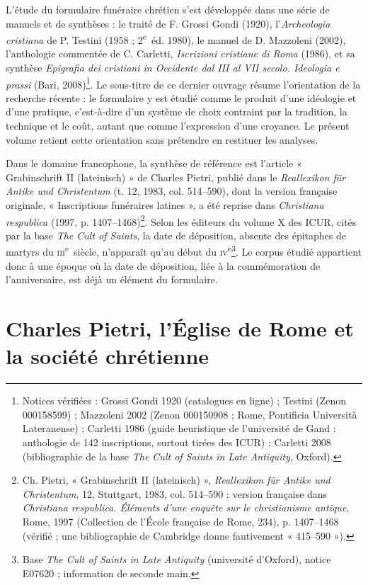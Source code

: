 L’étude du formulaire funéraire chrétien s’est développée dans une série de manuels et de synthèses : le traité de F. Grossi Gondi (1920), l’\emph{Archeologia cristiana} de P. Testini (1958 ; 2\textsuperscript{e}~éd. 1980), le manuel de D. Mazzoleni (2002), l’anthologie commentée de C. Carletti, \emph{Iscrizioni cristiane di Roma} (1986), et sa synthèse \emph{Epigrafia dei cristiani in Occidente dal III al VII secolo. Ideologia e prassi} (Bari, 2008)\footnote{Notices vérifiées : Grossi Gondi 1920 (catalogues en ligne) ; Testini (Zenon 000158599) ; Mazzoleni 2002 (Zenon 000150908 ; Rome, Pontificia Università Lateranense) ; Carletti 1986 (guide heuristique de l’université de Gand : anthologie de 142 inscriptions, surtout tirées des ICUR) ; Carletti 2008 (bibliographie de la base \emph{The Cult of Saints in Late Antiquity}, Oxford).}. Le sous-titre de ce dernier ouvrage résume l’orientation de la recherche récente : le formulaire y est étudié comme le produit d’une idéologie et d’une pratique, c’est-à-dire d’un système de choix contraint par la tradition, la technique et le coût, autant que comme l’expression d’une croyance. Le présent volume retient cette orientation sans prétendre en restituer les analyses.

Dans le domaine francophone, la synthèse de référence est l’article « Grabinschrift II (lateinisch) » de Charles Pietri, publié dans le \emph{Reallexikon für Antike und Christentum} (t. 12, 1983, col. 514–590), dont la version française originale, « Inscriptions funéraires latines », a été reprise dans \emph{Christiana respublica} (1997, p. 1407–1468)\footnote{Ch. Pietri, « Grabinschrift II (lateinisch) », \emph{Reallexikon für Antike und Christentum}, 12, Stuttgart, 1983, col. 514–590 ; version française dans \emph{Christiana respublica. Éléments d’une enquête sur le christianisme antique}, Rome, 1997 (Collection de l’École française de Rome, 234), p. 1407–1468 (vérifié ; une bibliographie de Cambridge donne fautivement « 415–590 »).}. Selon les éditeurs du volume X des ICUR, cités par la base \emph{The Cult of Saints}, la date de déposition, absente des épitaphes de martyrs du \textsc{iii}\textsuperscript{e}~siècle, n’apparaît qu’au début du \textsc{iv}\textsuperscript{e}\footnote{Base \emph{The Cult of Saints in Late Antiquity} (université d’Oxford), notice E07620 ; information de seconde main.}. Le corpus étudié appartient donc à une époque où la date de déposition, liée à la commémoration de l’anniversaire, est déjà un élément du formulaire.

\section{Charles Pietri, l’Église de Rome et la société chrétienne}

